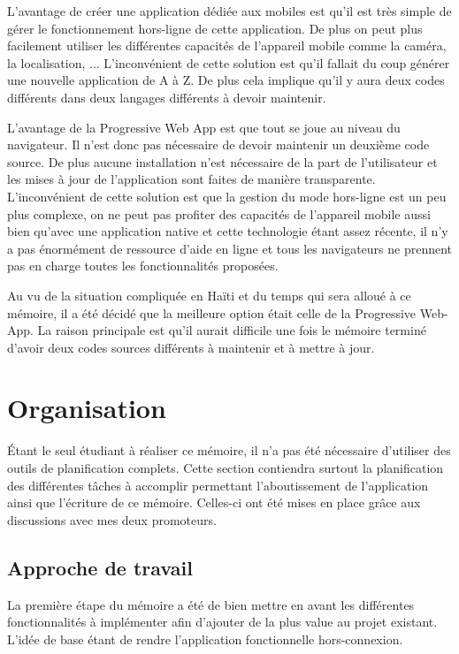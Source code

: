 \documentclass{EPL-master-thesis-covers-FR}
\begin{document}
			L'avantage de créer une application dédiée aux mobiles est qu'il est très simple de gérer le fonctionnement hors-ligne de cette application. De plus on peut plus facilement utiliser les différentes capacités de l'appareil mobile comme la caméra, la localisation, ...
			L'inconvénient de cette solution est qu'il fallait du coup générer une nouvelle application de A à Z. De plus cela implique qu'il y aura deux codes différents dans deux langages différents à devoir maintenir.
				
			L'avantage de la Progressive Web App est que tout se joue au niveau du navigateur. Il n'est donc pas nécessaire de devoir maintenir un deuxième code source. De plus aucune installation n'est nécessaire de la part de l'utilisateur et les mises à jour de l'application sont faites de manière transparente.
			L'inconvénient de cette solution est que la gestion du mode hors-ligne est un peu plus complexe, on ne peut pas profiter des capacités de l'appareil mobile aussi bien qu'avec une application native et cette technologie étant assez récente, il n'y a pas énormément de ressource d'aide en ligne et tous les navigateurs ne prennent pas en charge toutes les fonctionnalités proposées.
				
			Au vu de la situation compliquée en Haïti et du temps qui sera alloué à ce mémoire, il a été décidé que la meilleure option était celle de la Progressive Web-App. La raison principale est qu'il aurait difficile une fois le mémoire terminé d'avoir deux codes sources différents à maintenir et à mettre à jour.
			
			
			
			

	\chapter{Organisation}
		Étant le seul étudiant à réaliser ce mémoire, il n'a pas été nécessaire d'utiliser des outils de planification complets. Cette section contiendra surtout la planification des différentes tâches à accomplir permettant l'aboutissement de l'application ainsi que l'écriture de ce mémoire. Celles-ci ont été mises en place grâce aux discussions avec mes deux promoteurs. 

		\section{Approche de travail}
			La première étape du mémoire a été de bien mettre en avant les différentes fonctionnalités à implémenter afin d'ajouter de la plus value au projet existant. L'idée de base étant de rendre l'application fonctionnelle hors-connexion.	
			
\end{document}
